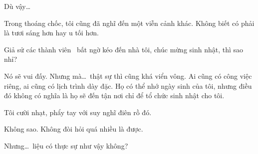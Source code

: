 \documentclass[../main.tex]{subfiles}
\begin{document}
Dù vậy\dots

Trong thoáng chốc, tôi cũng đã nghĩ đến một viễn cảnh khác. Không biết có phải là tươi sáng hơn hay u tối hơn.

Giả sử các thành viên \hll\ bất ngờ kéo đến nhà tôi, chúc mừng sinh nhật, thì sao nhỉ?

Nó sẽ vui đấy. Nhưng mà\dots\ thật sự thì cũng khá viển vông. Ai cũng có công việc riêng, ai cũng có lịch trình dày đặc. Họ có thể nhớ ngày sinh của tôi, nhưng điều đó không có nghĩa là họ sẽ đến tận nơi chỉ để tổ chức sinh nhật cho tôi.

Tôi cười nhạt, phẩy tay với suy nghĩ điên rồ đó.

Không sao. Không đòi hỏi quá nhiều là được.

Nhưng\dots\ liệu có thực sự như vậy không?
\end{document}
